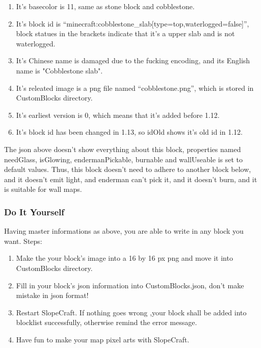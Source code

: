 \documentclass{article}
\begin{document}
    \begin{enumerate}
        \item It's basecolor is 11, same as stone block and cobblestone.
    
        \item It's block id is “minecraft:cobblestone\_slab[type=top,waterlogged=false]”, block statues in the brackets indicate that it's a upper slab and is not waterlogged.
    
        \item It's Chinese name is damaged due to the fucking encoding, and its English name is "Cobblestone slab".
    
        \item It's releated image is a png file named “cobblestone.png”, which is stored in CustomBlocks directory.
    
        \item It's earliest version is 0, which means that it's added before 1.12.
    
        \item It's block id has been changed in 1.13, so idOld shows it's old id in 1.12.

\end{enumerate}

    The json above doesn't show everything about this block, properties named needGlass, isGlowing, endermanPickable, burnable and wallUseable is set to default values. Thus, this block doesn't need to adhere to another block below, and it doesn't emit light, and enderman can't pick it, and it doesn't burn, and it is suitable for wall maps.

    \subsubsection{Do It Yourself}
    Having master informations as above, you are able to write in any block you want. Steps:

    \begin{enumerate}
        \item Make the your block's image into a 16 by 16 px png and move it into CustomBlocks directory.
        \item Fill in your block's json information into CustomBlocks.json, don't make mistake in json format!
        \item Restart SlopeCraft. If nothing goes wrong ,your block shall be added into blocklist successfully, otherwise remind the error message.
        \item Have fun to make your map pixel arts with SlopeCraft.
    \end{enumerate}
\end{document}
